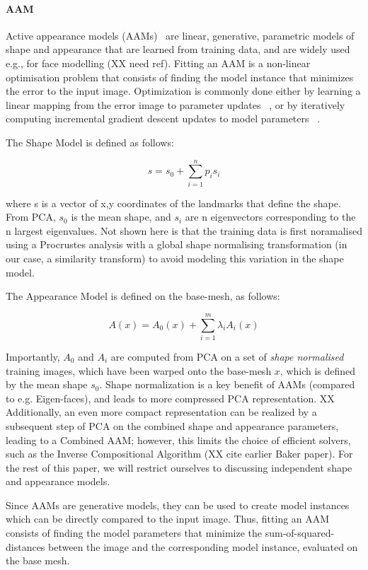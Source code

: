 \documentclass[10pt,twocolumn,letterpaper]{article}
\begin{document}
\paragraph{AAM}
Active appearance models (AAMs)~\cite{CootesAAM2001} are linear, generative, parametric models of shape and appearance that are learned from training data, and are widely used e.g., for face modelling (XX need ref).  Fitting an AAM is a non-linear optimisation problem that consists of finding the model instance that minimizes the error to the input image.  Optimization is commonly done either by learning a linear mapping from the error image to parameter updates ~\cite{CootesAAM2001}, or by iteratively computing incremental gradient descent updates to model parameters ~\cite{BakerAAM2004}. 

The Shape Model is defined as follows:

\[s = s_0 + \sum_{i=1}^n p_i s_i\]

where s is a vector of x,y coordinates of the landmarks that define the shape.  From PCA, $s_0$ is the mean shape, and $s_i$ are n eigenvectors corresponding to the n largest eigenvalues.  Not shown here is that the training data is first noramalised using a Procrustes analysis with a global shape normalising transformation (in our case, a similarity transform) to avoid modeling this variation in the shape model.

The Appearance Model is defined on the base-mesh, as follows:

\[A(x) = A_0(x) + \sum_{i=1}^m \lambda_i A_i(x)\]

Importantly, $A_0$ and $A_i$ are computed from PCA on a set of \emph{shape normalised} training images, which have been warped onto the base-mesh $x$, which is defined by the mean shape $s_0$.  Shape normalization is a key benefit of AAMs (compared to e.g. Eigen-faces), and leads to more compressed PCA representation.  XX Additionally, an even more compact representation can be realized by a subsequent step of PCA on the combined shape and appearance parameters, leading to a Combined AAM; however, this limits the choice of efficient solvers, such as the Inverse Compositional Algorithm (XX cite earlier Baker paper).  For the rest of this paper, we will restrict ourselves to discussing independent shape and appearance models.

Since AAMs are generative models, they can be used to create model instances which can be directly compared to the input image.  Thus, fitting an AAM consists of finding the model parameters that minimize the sum-of-squared-distances between the image and the corresponding model instance, evaluated on the base mesh.
\end{document}
